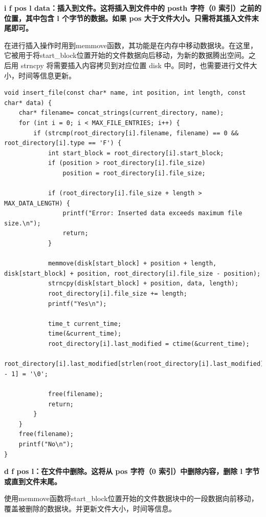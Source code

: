 \documentclass{article}
\begin{document}
\noindent\textbf{i f pos l data：插入到文件。这将插入到文件中的 posth 字符（0 索引）之前的位置，其中包含 l 个字节的数据。如果 pos 大于文件大小。只需将其插入文件末尾即可。}

在进行插入操作时用到memmove函数，其功能是在内存中移动数据块。在这里，它被用于将start\_block位置开始的文件数据向后移动，为新的数据腾出空间。之后用 strncpy 将需要插入内容拷贝到对应位置 disk 中。同时，也需要进行文件大小，时间等信息更新。

\begin{lstlisting}
void insert_file(const char* name, int position, int length, const char* data) {
    char* filename= concat_strings(current_directory, name);
    for (int i = 0; i < MAX_FILE_ENTRIES; i++) {
        if (strcmp(root_directory[i].filename, filename) == 0 && root_directory[i].type == 'F') {
            int start_block = root_directory[i].start_block;  
            if (position > root_directory[i].file_size)
                position = root_directory[i].file_size;

            if (root_directory[i].file_size + length > MAX_DATA_LENGTH) {
                printf("Error: Inserted data exceeds maximum file size.\n");
                return;
            }
                
            memmove(disk[start_block] + position + length, disk[start_block] + position, root_directory[i].file_size - position);
            strncpy(disk[start_block] + position, data, length);
            root_directory[i].file_size += length;
            printf("Yes\n");

            time_t current_time;
            time(&current_time);
            root_directory[i].last_modified = ctime(&current_time);
            root_directory[i].last_modified[strlen(root_directory[i].last_modified) - 1] = '\0';

            free(filename);
            return;
        }
    }
    free(filename);
    printf("No\n");
}
\end{lstlisting}

\noindent\textbf{d f pos l：在文件中删除。这将从 pos 字符（0 索引）中删除内容，删除 l 字节或直到文件末尾。}

使用memmove函数将start\_block位置开始的文件数据块中的一段数据向前移动，覆盖被删除的数据块。并更新文件大小，时间等信息。
\end{document}
